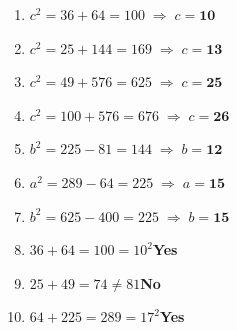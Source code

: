 \documentclass[11pt]{article}
\begin{document}
\begin{tcolorbox}[ansbox,title={Part 1 --- Pythagorean Theorem}]
\begin{enumerate}[leftmargin=*,label=\textbf{\arabic*.},itemsep=3pt]
\item $c^2=36+64=100\;\Rightarrow\;c=\mathbf{10}$
\item $c^2=25+144=169\;\Rightarrow\;c=\mathbf{13}$
\item $c^2=49+576=625\;\Rightarrow\;c=\mathbf{25}$
\item $c^2=100+576=676\;\Rightarrow\;c=\mathbf{26}$
\item $b^2=225-81=144\;\Rightarrow\;b=\mathbf{12}$
\item $a^2=289-64=225\;\Rightarrow\;a=\mathbf{15}$
\item $b^2=625-400=225\;\Rightarrow\;b=\mathbf{15}$
\item $36+64=100=10^2$\;\checkmark\;\textbf{Yes}
\item $25+49=74\neq 81$\;\textbf{No}
\item $64+225=289=17^2$\;\checkmark\;\textbf{Yes}
\end{enumerate}
\end{tcolorbox}

\vspace{0.5em}
\end{document}
